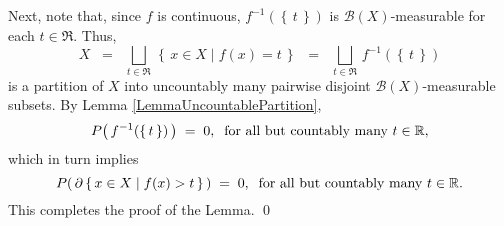 Next, note that, since $f$ is continuous,
$f^{-1}\!\left(\left\{\,t\,\right\}\right)$ is $\mathcal{B}(X)$-measurable for each $t \in \Re$.
Thus,
\begin{equation*}
X \;\; = \;\; \bigsqcup_{t \in \Re}\,\left\{\,x\in X \;\vert\; f(x) = t\,\right\}
\;\; = \;\; \bigsqcup_{t \in \Re}\, f^{-1}\!\left(\left\{\,t\,\right\}\right)
\end{equation*}
is a partition of $X$ into uncountably many pairwise disjoint $\mathcal{B}(X)$-measurable subsets.
By Lemma \ref{LemmaUncountablePartition},
\begin{equation*}
P\!\left(\,f^{-1}\!\left(\left\{\,t\,\right\}\right)\,\right) \; = \; 0,
\;\;\textnormal{for all but countably many $t \in \Re$},
\end{equation*}
which in turn implies
\begin{equation*}
P\!\left(\,\partial\left\{\,x\in X\;\vert\;f(x) > t\,\right\}\,\right) \; = \; 0,
\;\;\textnormal{for all but countably many $t \in \Re$}.
\end{equation*}
This completes the proof of the Lemma.
\qed


